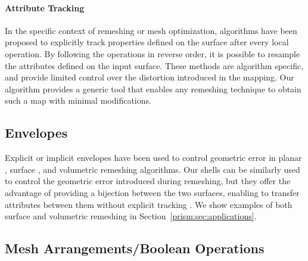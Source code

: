 \paragraph{Attribute Tracking}

In the specific context of remeshing or mesh optimization, algorithms have been proposed to explicitly track properties defined on the surface \cite{garland1997surface,cohen1997simplifying,dunyach2013adaptive} after every local operation. By following the operations in reverse order, it is possible to resample the attributes defined on the input surface. These methods are algorithm specific, and provide limited control over the distortion introduced in the mapping. Our algorithm provides a generic tool that enables any remeshing technique to obtain such a map with minimal modifications.%



\subsection{Envelopes}
Explicit \cite{cohen1996simplification,cohen1997simplifying} or implicit \cite{hu2016error} envelopes have been used to control geometric error in planar \cite{hu2019triwild}, surface {\cite{gueziec1996surface,hu2017, Cheng2019}}, and volumetric \cite{hu2018tetrahedral,Hu:2019:fTetWild} remeshing algorithms. Our shells can be similarly used to control the geometric error introduced during remeshing, but they offer the advantage of providing a bijection between the two surfaces, enabling to transfer attributes between them without explicit tracking \cite{cohen1997simplifying}. We show examples of both surface and volumetric remeshing in Section~\ref{prism:sec:applications}.

\subsection{Mesh Arrangements/Boolean Operations} 

